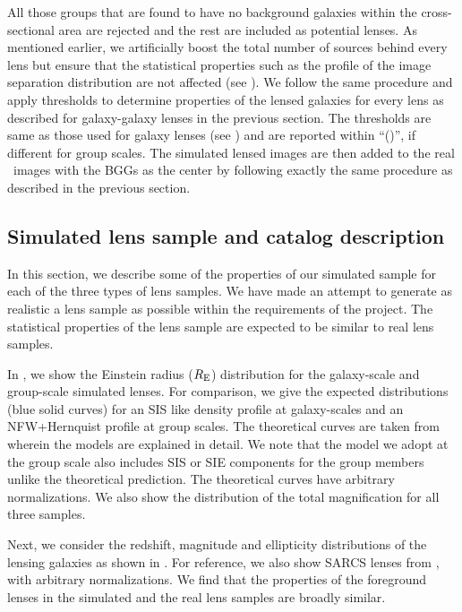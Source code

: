 \documentclass[useAMS,usenatbib,a4paper]{mn2e}
\begin{document}
All those groups that are found to have no background galaxies within the
cross-sectional area are rejected and the rest are included as potential lenses.
As mentioned earlier, we artificially boost the total number of sources behind
every lens but ensure that the statistical properties such as the profile of the
image separation distribution are not affected (see ). We
follow the same procedure and apply thresholds to determine properties
of the lensed galaxies for every lens as described for galaxy-galaxy lenses
in the previous section. The thresholds are same as those used for
galaxy lenses (see ) and are reported within ``()'', if
different for group scales. The simulated lensed images are then added
to the real \cfhtls~images with the BGGs as the center by following
exactly the same procedure as described in the previous section.


\subsection{Simulated lens sample and catalog description}

In this section, we describe some of the properties of our simulated sample for
each of the three types of lens samples. We have made an attempt to
generate as realistic a lens sample as possible within the requirements
of the \sw project. The statistical properties of the lens sample are
expected to be similar to real lens samples.

In , we show the Einstein radius ($R_{\rm E}$) distribution for the
galaxy-scale and group-scale simulated lenses. For comparison, we give
the expected distributions (blue solid curves) for an SIS like density
profile at galaxy-scales and an NFW+Hernquist profile at group scales.
The theoretical curves are taken from \citet{More2012} wherein the
models are explained in detail. We note that the model we adopt at
the group scale also includes SIS or SIE components for the group members
unlike the theoretical prediction. The theoretical curves have arbitrary
normalizations. We also show the distribution of the total magnification
for all three samples.

Next, we consider the redshift, magnitude and ellipticity distributions
of the lensing galaxies as shown in . For reference,
we also show SARCS lenses from \citet{More2012}, with arbitrary
normalizations. We find that the properties of the foreground lenses in
the simulated and the real lens samples are broadly similar.
\end{document}
